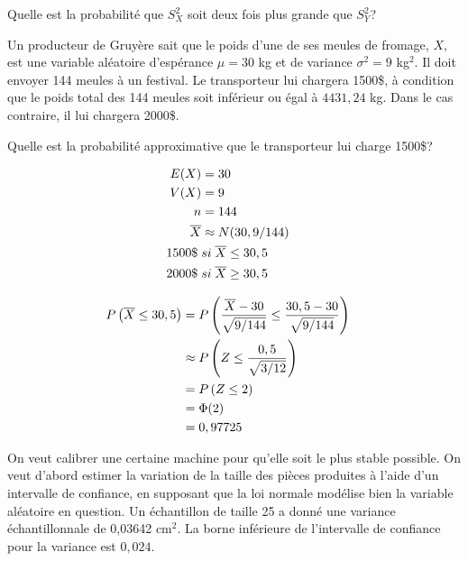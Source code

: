 \begin{questions}
Quelle est la probabilité que $S_X^2$ soit deux fois plus grande que $S_Y^2$?
\pageblanche

\question[8]
Un producteur de Gruyère sait que le poids d'une de ses meules de fromage, $X$, est une variable aléatoire d'espérance $\mu=30$ kg et de variance $\sigma^2 = 9$ kg$^2$. 
Il doit envoyer 144 meules à un festival. 
Le transporteur lui chargera 1500\$, à condition que le poids total des 144 meules soit inférieur ou égal à $4431,24$ kg. 
Dans le cas contraire, il lui chargera 2000\$.

Quelle est la probabilité approximative que le transporteur lui charge 1500\$?
    \vspace{12cm}

\begin{solution}
    \begin{align*}
        E(X) &= 30 \cr
        V(X) &= 9 \cr
        n&= 144 \cr
        \overline{X} &\approx N(30, 9/144) \cr
        1500 \$ \; &si \; \overline{X} \leq 30,5 \cr
        2000 \$ \; &si \; \overline{X} \geq 30,5 
    \end{align*}

    \begin{align*}
        P\left( \overline{X} \leq 30,5 \right)
        &= P\left( \frac{\overline{X}-30}{\sqrt{9/144}} \leq \frac{30,5-30}{\sqrt{9/144}}  \right) \cr
        &\approx P\left( Z \leq \frac{0,5}{\sqrt{3/12}}  \right) \cr
        &= P\left( Z \leq 2 \right) \cr
        &= \Phi(2) \cr
        &= 0,97725
    \end{align*}
\end{solution}

\pageblanche


\question On veut calibrer une certaine machine pour qu'elle soit le plus stable possible.
On veut d’abord estimer la variation de la taille des pièces produites à l'aide d'un intervalle de confiance, en supposant que la loi normale modélise bien la variable aléatoire en question.
Un échantillon de taille 25 a donné une variance échantillonnale de 0,03642 cm$^2$.
La borne inférieure de l'intervalle de confiance pour la variance est $0,024$.

\vspace{0.5cm}
\end{questions}
